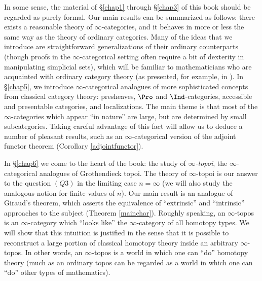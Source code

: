 In some sense, the material of \S \ref{chap1} through \S \ref{chap3} of this book should be regarded as purely formal. Our main results can be summarized as follows: there exists a reasonable theory of $\infty$-categories, and it behaves in more or less the same way as the theory of ordinary categories. Many of the ideas that we introduce are straightforward generalizations of their ordinary counterparts (though proofs in the $\infty$-categorical setting often require a bit of dexterity in manipulating simplicial sets), which will be familiar to mathematicians who are acquainted with ordinary category theory (as presented, for example, in \cite{maclane}). In \S \ref{chap5}, we introduce $\infty$-categorical analogues of more sophisticated concepts from classical category theory: presheaves, $\Pro$ and $\Ind$-categories, accessible and presentable categories, and localizations. The main theme is that most of the $\infty$-categories which appear ``in nature'' are large, but are determined by small subcategories. Taking careful advantage of this fact will allow us to deduce a number of pleasant results, such as an $\infty$-categorical version of the adjoint functor theorem (Corollary \ref{adjointfunctor}).

In \S \ref{chap6} we come to the heart of the book: the study of {\it $\infty$-topoi}, the $\infty$-categorical analogues of Grothendieck topoi. The theory of $\infty$-topoi is our answer
to the question $(Q3)$ in the limiting case $n = \infty$ (we will also study the analogous notion
for finite values of $n$). Our main result is an analogue of Giraud's theorem, which asserts the equivalence of ``extrinsic'' and ``intrinsic'' approaches to the subject (Theorem \ref{mainchar}). 
Roughly speaking, an $\infty$-topos is an $\infty$-category which ``looks like'' the $\infty$-category of all homotopy types. We will show that this intuition is justified in the sense that it is possible to reconstruct a large portion of classical homotopy theory inside an arbitrary $\infty$-topos. In other words, an $\infty$-topos
is a world in which one can ``do'' homotopy theory (much as an ordinary topos can be regarded as a world in which one can ``do'' other types of mathematics).



